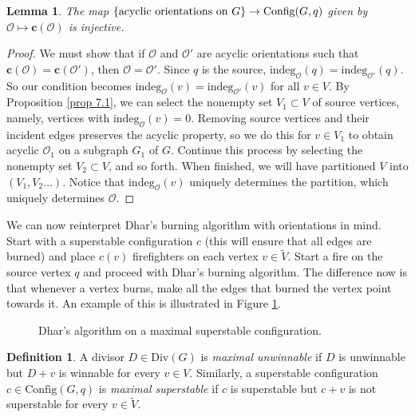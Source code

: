 \documentclass[openany, amssymb, psamsfonts]{amsart}
\newtheorem{lem}{Lemma}[section]
\theoremstyle{definition}
\newtheorem{defn}{Definition}[section]
\numberwithin{equation}{section}
\begin{document}
\begin{lem}
\label{lem 7.1}
The map $\{\text{acyclic orientations on }G\} \rightarrow \textup{Config}(G,q)$ given by $\mathcal{O}\mapsto \textbf{c}({\mathcal{O}})$ is injective.
\end{lem}
\begin{proof}
We must show that if $\mathcal{O}$ and $\mathcal{O'}$ are acyclic orientations such that $\textbf{c}(\mathcal{O})=\textbf{c}(\mathcal{O'})$, then $\mathcal{O}=\mathcal{O'}$. Since $q$ is the source, $\text{indeg}_{\mathcal{O}}(q)=\text{indeg}_{\mathcal{O'}}(q)$. So our condition becomes $\text{indeg}_{\mathcal{O}}(v)=\text{indeg}_{\mathcal{O'}}(v)$ for all $v\in V$. By Proposition \ref{prop 7.1}, we can select the nonempty set $V_1\subset V$ of source vertices, namely, vertices with $\text{indeg}_{\mathcal{O}}(v)=0$. Removing source vertices and their incident edges preserves the acyclic property, so we do this for $v\in V_1$ to obtain acyclic $\mathcal{O}_1$ on a subgraph $G_1$ of $G$. Continue this process by selecting the nonempty set $V_2\subset V$, and so forth. When finished, we will have partitioned $V$ into $(V_1,V_2\dots)$. Notice that $\text{indeg}_{\mathcal{O}}(v)$ uniquely determines the partition, which uniquely determines $\mathcal{O}$.
\end{proof}

We can now reinterpret Dhar's burning algorithm with orientations in mind. Start with a superstable configuration $c$ (this will ensure that all edges are burned) and place $c(v)$ firefighters on each vertex $v\in \tilde{V}$. Start a fire on the source vertex $q$ and proceed with Dhar's burning algorithm. The difference now is that whenever a vertex burns, make all the edges that burned the vertex point towards it. An example of this is illustrated in Figure \ref{fig 7.3}.

\begin{figure}[ht]
    \centering
    
    \caption{Dhar's algorithm on a maximal superstable configuration.}
    \label{fig 7.3}
\end{figure}

\begin{defn}
\label{defn 7.5}
A divisor $D\in \text{Div}(G)$ is \textit{maximal unwinnable} if $D$ is unwinnable but $D+v$ is winnable for every $v\in V$. Similarly, a superstable configuration $c\in \text{Config}(G,q)$ is \textit{maximal superstable} if $c$ is superstable but $c+v$ is not superstable for every $v\in \tilde{V}$.
\end{defn}
\end{document}
